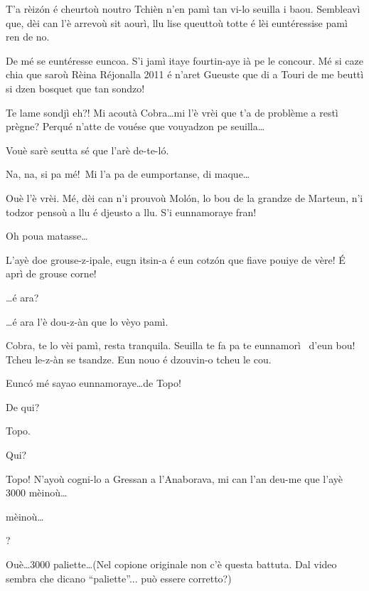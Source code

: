 \begin{drama}
\Tzardounspeaks T’a rèiz\'on é cheurtoù noutro Tchièn n’en pamì tan vi-lo seuilla i baou. Sembleavì que, dèi can l'è arrevoù sit aourì, llu lise queuttoù totte é lèi euntéressise pamì ren de no.

\Cobraspeaks De mé se euntéresse euncoa. S’i jamì itaye fourtin-aye ià pe le concour. Mé si caze chia que saroù Rèina Réjonalla 2011 é n’aret Gueuste que di a Touri de me beuttì si dzen bosquet que tan sondzo!

\Tzardounspeaks Te lame sondjì eh?!  Mi acoutà Cobra\ldots mi l’è vrèi que t’a de problème a restì prègne? Perqué n’atte de vouése que vouyadzon pe seuilla\ldots


\Cobraspeaks Vouè sarè seutta sé que l’arè de-te-l\'o.

\Piccinaspeaks Na, na, si pa mé!\imbarazzatoo\ Mi l’a pa de eumportanse, di maque\ldots

\Cobraspeaks Ouè l’è vrèi. Mé, dèi can n’i prouvoù Mol\'on, lo bou de la grandze de Marteun, n’i todzor pensoù a llu é djeusto a llu. S’i eunnamoraye fran!

\Piccinaspeaks Oh poua matasse\ldots

\Cobraspeaks  L’ayè doe grouse-z-ipale, eugn itsin-a é eun cotz\'on que fiave pouiye de vère! \'E aprì de grouse corne!

\Piccinaspeaks \ldots é ara?

\Cobraspeaks \ldots é ara l’è dou-z-àn que lo vèyo pamì.

\Tzardounspeaks Cobra, te lo vèi pamì, resta tranquila. Seuilla te fa pa te eunnamorì \inamourou\ d’eun bou! Tcheu le-z-àn se tsandze. Eun nouo é dzouvin-o tcheu le cou.

\Piccinaspeaks Eunc\'o mé sayao eunnamoraye\ldots de Topo!

\Tzardounspeaks De qui?

\Piccinaspeaks Topo.

\Tzardounspeaks Qui?

\Piccinaspeaks {} Topo! N’ayoù cogni-lo a Gressan a l’Anaborava, mi can l’an deu-me que l’ayè 3000 mèinoù\ldots

 mèinoù\ldots

?

\Piccinaspeaks Ouè\ldots 3000 paliette\ldots (Nel copione originale non c'è questa battuta. Dal video sembra che dicano ``paliette''... può essere corretto?)


\end{drama}
